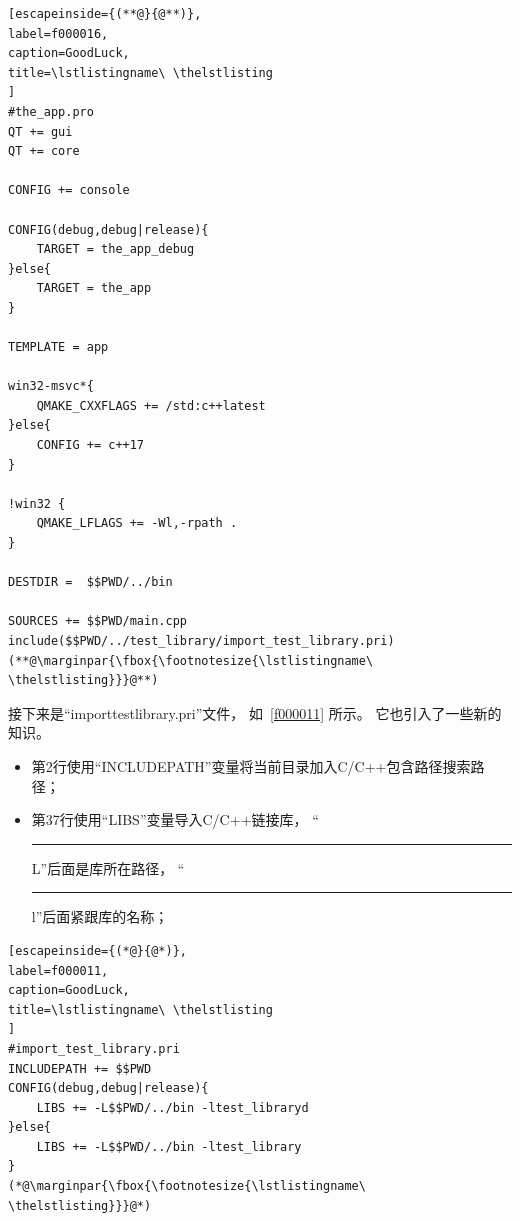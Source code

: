 \FloatBarrier
\begin{lstlisting}[escapeinside={(**@}{@**)},
label=f000016,
caption=GoodLuck,
title=\lstlistingname\ \thelstlisting
]
#the_app.pro
QT += gui
QT += core

CONFIG += console

CONFIG(debug,debug|release){
    TARGET = the_app_debug
}else{
    TARGET = the_app
}

TEMPLATE = app

win32-msvc*{
    QMAKE_CXXFLAGS += /std:c++latest
}else{
    CONFIG += c++17
}

!win32 {
    QMAKE_LFLAGS += -Wl,-rpath .
}

DESTDIR =  $$PWD/../bin

SOURCES += $$PWD/main.cpp
include($$PWD/../test_library/import_test_library.pri)
(**@\marginpar{\fbox{\footnotesize{\lstlistingname\ \thelstlisting}}}@**)\end{lstlisting}          %


接下来是“import\underline{\hspace{0.5em}}test\underline{\hspace{0.5em}}library.pri”文件，
如\lstlistingname\ \ref{f000011} 所示。
它也引入了一些新的知识。
\begin{itemize}
\item 第2行使用“INCLUDEPATH”变量将当前目录加入C/C{\sourcefonttwo{}+}{\sourcefonttwo{}+}包含路径搜索路径；
\item 第3\raisebox{0.16ex}{\sourcefonttwo\~{}}7行使用“LIBS”变量导入C/C{\sourcefonttwo{}+}{\sourcefonttwo{}+}链接库，
“\hspace{0.05em}\rule[0.7ex]{0.4em}{0.65pt}\hspace{0.05em}L”后面是库所在路径，
“\hspace{0.05em}\rule[0.7ex]{0.4em}{0.65pt}\hspace{0.05em}l”后面紧跟库的名称；
\end{itemize}
\FloatBarrier
\begin{lstlisting}[escapeinside={(*@}{@*)},
label=f000011,
caption=GoodLuck,
title=\lstlistingname\ \thelstlisting
]
#import_test_library.pri
INCLUDEPATH += $$PWD
CONFIG(debug,debug|release){
    LIBS += -L$$PWD/../bin -ltest_libraryd
}else{
    LIBS += -L$$PWD/../bin -ltest_library
}
(*@\marginpar{\fbox{\footnotesize{\lstlistingname\ \thelstlisting}}}@*)\end{lstlisting}          %


